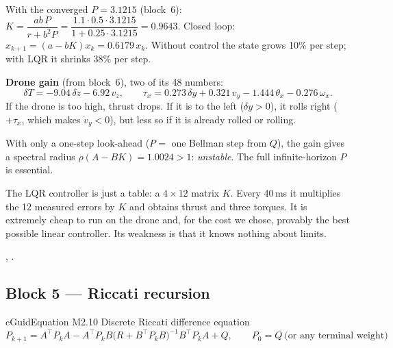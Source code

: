 \begin{toybox}
With the converged $P=3.1215$ (block~6): $K=\dfrac{ab\,P}{r+b^2P}=\dfrac{1.1\cdot0.5\cdot3.1215}{1+0.25\cdot3.1215}=0.9643$.
Closed loop: $x_{k+1}=(a-bK)x_k=0.6179\,x_k$. Without control the state grows 10\% per step; with LQR it shrinks
38\% per step.

\textbf{Drone gain} (from block~6), two of its 48 numbers:
\[
\delta T=-9.04\,\delta z-6.92\,v_z,\qquad
\tau_x=0.273\,\delta y+0.321\,v_y-1.444\,\theta_x-0.276\,\omega_x .
\]
If the drone is too high, thrust drops. If it is to the left ($\delta y>0$), it rolls right ($+\tau_x$, which makes $\dot v_y<0$),
but less so if it is already rolled or rolling.

With only a one-step look-ahead ($P=$ one Bellman step from $Q$), the gain gives a spectral radius
$\rho(A-BK)=1.0024>1$: \emph{unstable}. The full infinite-horizon $P$ is essential.
\end{toybox}

\begin{projbox}
The LQR controller is just a table: a $4\times12$ matrix $K$. Every 40\,ms it multiplies the 12 measured errors by $K$
and obtains thrust and three torques. It is extremely cheap to run on the drone and, for the cost we chose,
provably the best possible linear controller. Its weakness is that it knows nothing about limits.
\end{projbox}

\begin{codebox}
\intoy {}, .
\end{codebox}

\subsection{Block 5 --- Riccati recursion}
\label{sec:m2b5}

\begin{eqbox}{cGuid}{Equation M2.10 \quad Discrete Riccati difference equation}
\begin{equation}
  P_{k+1}=A^\top P_kA-A^\top P_kB\big(R+B^\top P_kB\big)^{-1}B^\top P_kA+Q,\qquad P_0=Q\ \text{(or any terminal weight)} \tag{M2.10}\label{eq:m2.10}
\end{equation}
\end{eqbox}

